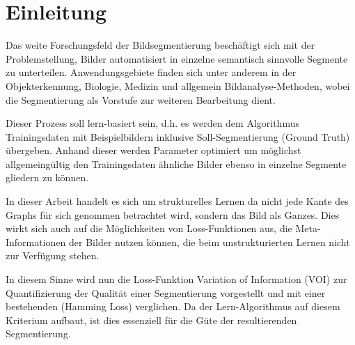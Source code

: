 \chapter{Einleitung}\label{ch:introduction}

Das weite Forschungsfeld der Bildsegmentierung beschäftigt sich mit der Problemstellung, Bilder automatisiert in einzelne semantisch sinnvolle Segmente zu unterteilen. Anwendungsgebiete finden sich unter anderem in der Objekterkennung, Biologie, Medizin und allgemein Bildanalyse-Methoden, wobei die Segmentierung als Vorstufe zur weiteren Bearbeitung dient. \\





\begin{figure}[H]
	\centering
	\hfill
\end{figure}
\vspace{-0.5cm}

\vspace{0.8cm}


Dieser Prozess soll lern-basiert sein, d.h. es werden dem Algorithmus Trainingsdaten mit Beispielbildern inklusive Soll-Segmentierung (Ground Truth) übergeben. Anhand dieser werden Parameter optimiert um möglichst allgemeingültig den Trainingsdaten ähnliche Bilder ebenso in einzelne Segmente gliedern zu können.

In dieser Arbeit handelt es sich um strukturelles Lernen da nicht jede Kante des Graphs für sich genommen betrachtet wird, sondern das Bild als Ganzes. Dies wirkt sich auch auf die Möglichkeiten von Loss-Funktionen aus, die Meta-Informationen der Bilder nutzen können, die beim unstrukturierten Lernen nicht zur Verfügung stehen.

In diesem Sinne wird nun die Loss-Funktion Variation of Information (VOI) zur Quantifizierung der Qualität einer Segmentierung vorgestellt und mit einer bestehenden (Hamming Loss) verglichen. Da der Lern-Algorithmus auf diesem Kriterium aufbaut, ist dies essenziell für die Güte der resultierenden Segmentierung.

\newpage

